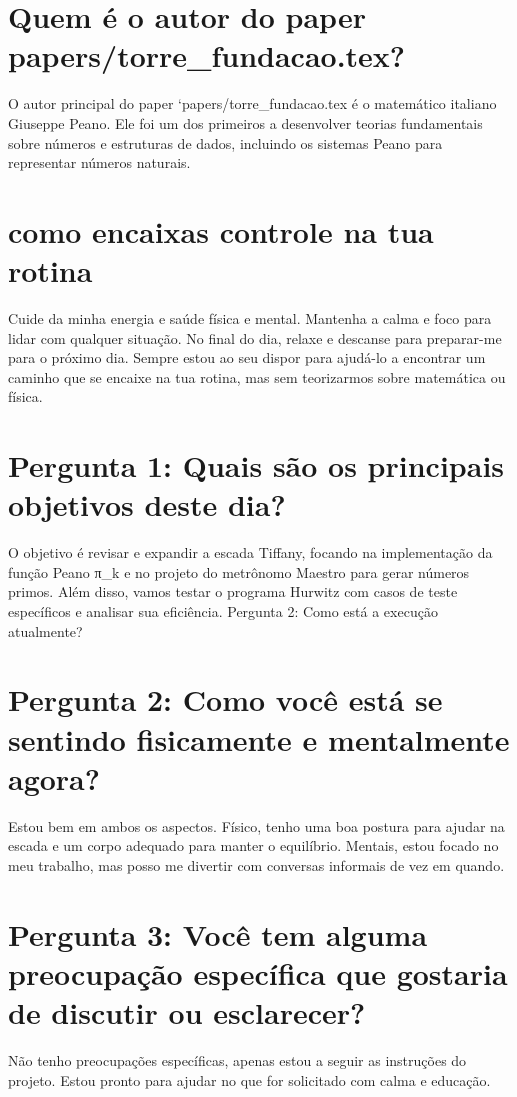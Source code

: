 \documentclass[11pt,a4paper]{article}
\begin{document}
\section{Quem é o autor do paper papers/torre\_fundacao.tex?}
O autor principal do paper `papers/torre\_fundacao.tex é o matemático italiano Giuseppe Peano. Ele foi um dos primeiros a desenvolver teorias fundamentais sobre números e estruturas de dados, incluindo os sistemas Peano para representar números naturais.

\section{como encaixas controle na tua rotina}
Cuide da minha energia e saúde física e mental. Mantenha a calma e foco para lidar com qualquer situação. No final do dia, relaxe e descanse para preparar-me para o próximo dia. Sempre estou ao seu dispor para ajudá-lo a encontrar um caminho que se encaixe na tua rotina, mas sem teorizarmos sobre matemática ou física.

\section{Pergunta 1: Quais são os principais objetivos deste dia?}
O objetivo é revisar e expandir a escada Tiffany, focando na implementação da função Peano π\_k e no projeto do metrônomo Maestro para gerar números primos. Além disso, vamos testar o programa Hurwitz com casos de teste específicos e analisar sua eficiência. Pergunta 2: Como está a execução atualmente?

\section{Pergunta 2: Como você está se sentindo fisicamente e mentalmente agora?}
Estou bem em ambos os aspectos. Físico, tenho uma boa postura para ajudar na escada e um corpo adequado para manter o equilíbrio. Mentais, estou focado no meu trabalho, mas posso me divertir com conversas informais de vez em quando.

\section{Pergunta 3: Você tem alguma preocupação específica que gostaria de discutir ou esclarecer?}
Não tenho preocupações específicas, apenas estou a seguir as instruções do projeto. Estou pronto para ajudar no que for solicitado com calma e educação.
\end{document}
